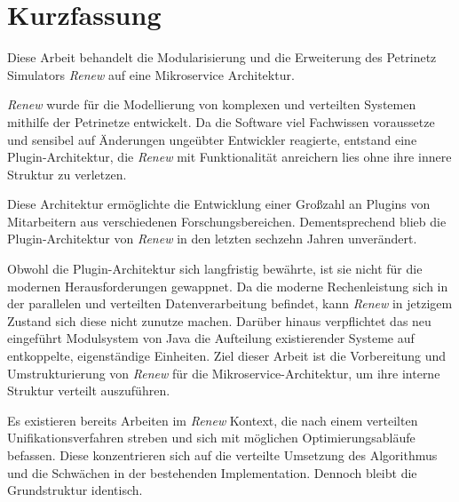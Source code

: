 



\newpage

\chapter*{Kurzfassung}
Diese Arbeit behandelt die Modularisierung und die Erweiterung des Petrinetz Simulators \textit{Renew} auf eine Mikroservice Architektur.

\textit{Renew} wurde für die Modellierung von komplexen und verteilten Systemen mithilfe der Petrinetze entwickelt. Da die Software viel Fachwissen voraussetze und sensibel auf Änderungen ungeübter Entwickler reagierte, entstand eine Plugin-Architektur, die \textit{Renew} mit Funktionalität anreichern lies ohne ihre innere Struktur zu verletzen. 

Diese Architektur ermöglichte die Entwicklung einer Großzahl an Plugins von Mitarbeitern aus verschiedenen Forschungsbereichen.
Dementsprechend blieb die Plugin-Architektur von \textit{Renew} in den letzten sechzehn Jahren unverändert. \bigbreak

Obwohl die Plugin-Architektur sich langfristig bewährte, ist sie nicht für die modernen Herausforderungen gewappnet. Da die moderne Rechenleistung sich in der parallelen und verteilten Datenverarbeitung befindet, kann \textit{Renew} in jetzigem Zustand sich diese nicht zunutze machen. Darüber hinaus verpflichtet das neu eingeführt Modulsystem von Java die Aufteilung existierender Systeme auf entkoppelte, eigenständige Einheiten. Ziel dieser Arbeit ist die Vorbereitung und Umstrukturierung von \textit{Renew} für die Mikroservice-Architektur, um ihre interne Struktur verteilt auszuführen.\bigbreak

Es existieren bereits Arbeiten im \textit{Renew} Kontext, die nach einem verteilten Unifikationsverfahren streben und sich mit möglichen Optimierungsabläufe befassen.
Diese konzentrieren sich auf die verteilte Umsetzung des Algorithmus und die Schwächen in der bestehenden Implementation. Dennoch bleibt die Grundstruktur identisch. \bigbreak

